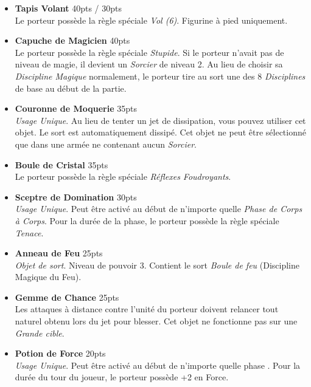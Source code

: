 \begin{multicols}{2}
\begin{itemize}[label={-}]
\item \textbf{Tapis Volant} \dotfill \unit{40}{pts} / \unit{30}{pts} \\
Le porteur possède la règle spéciale \emph{Vol (6)}. Figurine à pied uniquement.

\item \textbf{Capuche de Magicien} \dotfill \unit{40}{pts} \\
Le porteur possède la règle spéciale \emph{Stupide}. Si le porteur n'avait pas de niveau de magie, il devient un \emph{Sorcier} de niveau 2. Au lieu de choisir sa \emph{Discipline Magique} normalement, le porteur tire au sort une des 8 \emph{Disciplines} de base au début de la partie.

\item \textbf{Couronne de Moquerie} \dotfill \unit{35}{pts} \\
\emph{Usage Unique}. Au lieu de tenter un jet de dissipation, vous pouvez utiliser cet objet. Le sort est automatiquement dissipé. Cet objet ne peut être sélectionné que dans une armée ne contenant aucun \emph{Sorcier}.

\item \textbf{Boule de Cristal} \dotfill \unit{35}{pts} \\
Le porteur possède la règle spéciale \emph{Réflexes Foudroyants}.

\item \textbf{Sceptre de Domination} \dotfill \unit{30}{pts} \\
\emph{Usage Unique}. Peut être activé au début de n'importe quelle \emph{Phase de Corps à Corps}. Pour la durée de la phase, le porteur possède la règle spéciale \emph{Tenace}.

\item \textbf{Anneau de Feu} \dotfill \unit{25}{pts} \\
\emph{Objet de sort}. Niveau de pouvoir 3. Contient le sort \emph{Boule de feu} (Discipline Magique du Feu).

\item \textbf{Gemme de Chance} \dotfill \unit{25}{pts} \\
Les attaques à distance contre l'unité du porteur doivent relancer tout  naturel obtenu lors du jet pour blesser. Cet objet ne fonctionne pas sur une \emph{Grande cible}.

\item \textbf{Potion de Force} \dotfill \unit{20}{pts} \\
\emph{Usage Unique}. Peut être activé au début de n'importe quelle phase . Pour la durée du tour du joueur, le porteur possède +2 en Force.


\end{itemize}
\end{multicols}
